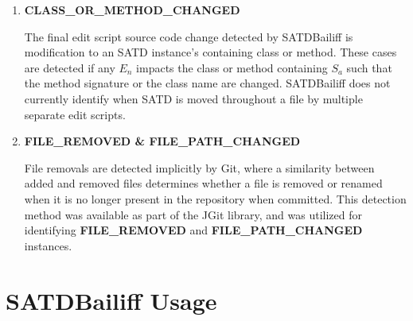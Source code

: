 \documentclass[3p]{elsarticle}
\newcommand{\approach}{SATDBailiff\xspace}
\newcommand{\ali}[1]{\textcolor{red}{{\it [Ali: #1]}}}
\DeclareRobustCommand{\hlremove}[1]{{\sethlcolor{soulred}\hl{#1}}}
\DeclareRobustCommand{\hladd}[1]{{\sethlcolor{soulgreen}\hl{#1}}}
\begin{document}
\begin{enumerate}
\begin{figure}
    \centering
    \begin{tabular}{|p{25.2em}|}
    \hline
        \begin{lstlisting}
  // lets test the receive worked
|\hlremove{- // TODO~~~~~~~~~~~~~~~~~~~~~~~~~~~~~~~~~}|
|\hlremove{- // assertMessageRec("???@localhost");~~~}|
|\hladd   {+ assertMessageRec("copy@localhost");~~~~~}|
  c.connect();
        \end{lstlisting}
    \\\hline
    \end{tabular}
    \caption{\textbf{SATD\_REMOVED} instance removing only part of a comment}
    \label{fig:change_removal}
\end{figure}

\item \textbf{CLASS\_OR\_METHOD\_CHANGED}

The final edit script source code change detected by \approach is modification to an SATD instance's containing class or method. These cases are detected if any $E_n$ impacts the class or method containing $S_a$ such that the method signature or the class name are changed. \approach does not currently identify when SATD is moved throughout a file by multiple separate edit scripts.

\item \textbf{FILE\_REMOVED \& FILE\_PATH\_CHANGED}


File removals are detected implicitly by Git, where a similarity between added and removed files determines whether a file is removed or renamed when it is no longer present in the repository when committed. This detection method was available as part of the JGit library, and was utilized for identifying \textbf{FILE\_REMOVED} and \textbf{FILE\_PATH\_CHANGED} instances.

\end{enumerate}
\section{\approach Usage}
\label{section:usage}
\end{document}
